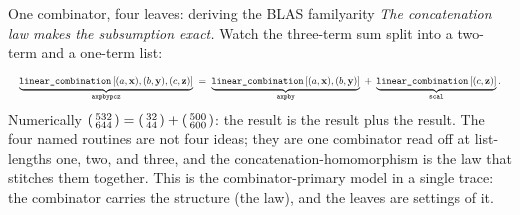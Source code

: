 \begin{workedexample}{One combinator, four leaves: deriving the BLAS family}{arity}
\emph{The concatenation law makes the subsumption exact.} Watch the three-term sum
split into a two-term and a one-term list:
\[
  \resizebox{\linewidth}{!}{$\displaystyle
  \underbrace{\code{linear\_combination}\,[(a,\vx),(b,\vy),(c,\vz)]}_{\code{axpbypcz}}
  \;=\;
  \underbrace{\code{linear\_combination}\,[(a,\vx),(b,\vy)]}_{\code{axpby}}
  \;+\;
  \underbrace{\code{linear\_combination}\,[(c,\vz)]}_{\code{scal}}.
  $}
\]
Numerically $\begin{psmallmatrix}532\\644\end{psmallmatrix} =
\begin{psmallmatrix}32\\44\end{psmallmatrix} + \begin{psmallmatrix}500\\600\end{psmallmatrix}$:
the  result is the  result plus the  result.
The four named routines are not four ideas; they are one combinator read off at
list-lengths one, two, and three, and the concatenation-homomorphism is the law
that stitches them together. This is the combinator-primary model in a single
trace: the combinator carries the structure (the law), and the leaves are settings
of it.
\end{workedexample}

